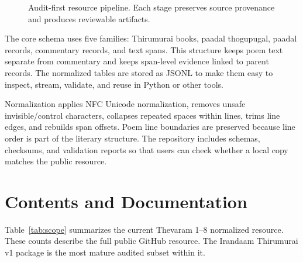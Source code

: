 \documentclass[sigconf]{acmart}
\begin{document}
\begin{figure}[t]
  \centering
  \caption{Audit-first resource pipeline. Each stage preserves source provenance and produces reviewable artifacts.}
  \label{fig:pipeline}
\end{figure}

The core schema uses five families: Thirumurai books, paadal thogupugal, paadal records, commentary records, and text spans. This structure keeps poem text separate from commentary and keeps span-level evidence linked to parent records. The normalized tables are stored as JSONL to make them easy to inspect, stream, validate, and reuse in Python or other tools.

Normalization applies NFC Unicode normalization, removes unsafe invisible/control characters, collapses repeated spaces within lines, trims line edges, and rebuilds span offsets. Poem line boundaries are preserved because line order is part of the literary structure. The repository includes schemas, checksums, and validation reports so that users can check whether a local copy matches the public resource.

\section{Contents and Documentation}

Table~\ref{tab:scope} summarizes the current Thevaram 1--8 normalized resource. These counts describe the full public GitHub resource. The Irandaam Thirumurai v1 package is the most mature audited subset within it.
\end{document}
